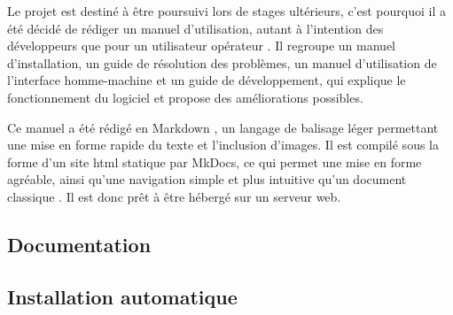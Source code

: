 			Le projet est destiné à être poursuivi lors de stages ultérieurs, c'est pourquoi il a été décidé de rédiger un manuel d'utilisation, autant à l'intention des développeurs que pour un utilisateur \og opérateur \fg{}. Il regroupe un manuel d'installation, un guide de résolution des problèmes, un manuel d'utilisation de l'interface homme-machine et un guide de développement, qui explique le fonctionnement du logiciel et propose des améliorations possibles.
			\par
			Ce manuel a été rédigé en Markdown \cite{markdown}, un langage de balisage léger permettant une mise en forme rapide du texte et l'inclusion d'images. Il est compilé sous la forme d'un site html statique par MkDocs\cite{mkdocs}, ce qui permet une mise en forme agréable, ainsi qu'une navigation simple et plus intuitive qu'un document \og classique \fg{}. Il est donc prêt à être hébergé sur un serveur web.
			
		\subsection{Documentation}
		
			
		\subsection{Installation automatique}
		
				
